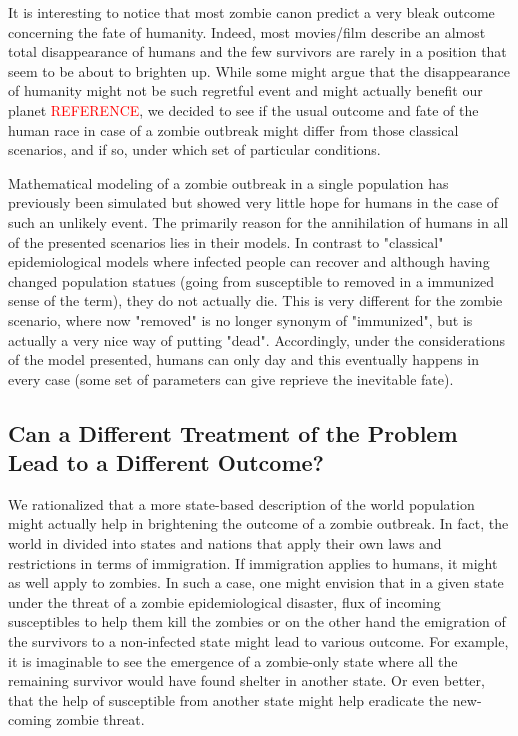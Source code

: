 \documentclass[11pt]{article} %
\begin{document}
It is interesting to notice that most zombie canon predict a very bleak outcome concerning the fate of humanity. Indeed, most movies/film describe an almost total disappearance of humans and the few survivors are rarely in a position that seem to be about to brighten up. While some might argue that the disappearance of humanity might not be such regretful event and might actually benefit our planet \textcolor{red}{REFERENCE}, we decided to see if the usual outcome and fate of the human race in case of a zombie outbreak might differ from those classical scenarios, and if so, under which set of particular conditions. 

Mathematical modeling of a zombie outbreak in a single population has previously been simulated \cite{munz2009zombies} but showed very little hope for humans in the case of such an unlikely event. The primarily reason for the annihilation of humans in all of the presented scenarios lies in their models. In contrast to "classical" epidemiological models where infected people can recover and although having changed population statues (going from susceptible to removed in a immunized sense of the term), they do not actually die. This is very different for the zombie scenario, where now "removed" is no longer synonym of "immunized", but is actually a very nice way of putting "dead". Accordingly, under the considerations of the model presented, humans can only day and this eventually happens in every case (some set of parameters can give reprieve the inevitable fate).\\

\subsection{Can a Different Treatment of the Problem Lead to a Different Outcome?}\indent

We rationalized that a more state-based description of the world population might actually help in brightening the outcome of a zombie outbreak. In fact, the world in divided into states and nations that apply their own laws and restrictions in terms of immigration. If immigration applies to humans, it might as well apply to zombies. In such a case, one might envision that in a given state under the threat of a zombie epidemiological disaster, flux of incoming susceptibles to help them kill the zombies or on the other hand the emigration of the survivors to a non-infected state might lead to various outcome. For example, it is imaginable to see the emergence of a zombie-only state where all the remaining survivor would have found shelter in another state. Or even better, that the help of susceptible from another state might help eradicate the new-coming zombie threat. 
\end{document}
